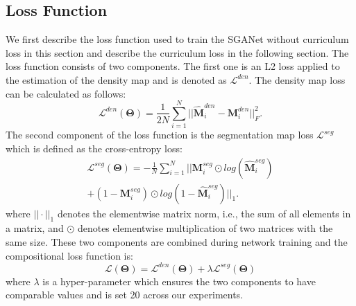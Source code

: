 \documentclass[journal,comsoc]{IEEEtran}
\begin{document}
\subsection{Loss Function} \label{sec:loss}
We first describe the loss function used to train the SGANet without curriculum loss in this section and describe the curriculum loss in the following section. The loss function consists of two components. The first one is an L2 loss applied to the estimation of the density map and is denoted as $\mathcal{L}^{den}$. The density map loss can be calculated as follows:
\begin{equation}
    \label{eq:denloss}
    \mathcal{L}^{den}(\bm{\Theta}) = \frac{1}{2N} \sum_{i=1}^N ||\hat{\bm{M}}_i^{den} - \bm{M}^{den}_i||_F^2.
\end{equation}
The second component of the loss function is the segmentation map loss $\mathcal{L}^{seg}$ which is defined as the cross-entropy loss:
\begin{equation}
    \label{eq:segloss}
    \begin{multlined}
    \mathcal{L}^{seg}(\bm{\Theta}) = -\frac{1}{N} \sum_{i=1}^N ||\bm{M}_i^{seg} \odot log(\hat{\bm{M}}_i^{seg}) \\
    + (1-\bm{M}_i^{seg})\odot log(1-\hat{\bm{M}}_i^{seg})||_1.
    \end{multlined}
\end{equation}
where $||\cdot||_1$ denotes the elementwise matrix norm, i.e., the sum of all elements in a matrix, and $\odot$ denotes elementwise multiplication of two matrices with the same size.
These two components are combined during network training and the compositional loss function is:
\begin{equation}
    \label{eq:loss}
    \mathcal{L}(\bm{\Theta}) = \mathcal{L}^{den}(\bm{\Theta}) + \lambda \mathcal{L}^{seg}(\bm{\Theta}) 
\end{equation}
where $\lambda$ is a hyper-parameter which ensures the two components to have comparable values and is set 20 across our experiments.
\end{document}
